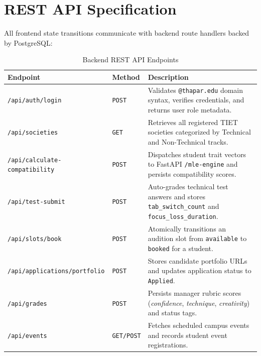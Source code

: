 \documentclass[12pt,a4paper]{report}
\begin{document}
\section{REST API Specification}
All frontend state transitions communicate with backend route handlers backed by PostgreSQL:
\begin{table}[H]
\centering
\renewcommand{\arraystretch}{1.25}
\begin{tabularx}{\textwidth}{@{}l l X@{}}
\toprule
\textbf{Endpoint} & \textbf{Method} & \textbf{Description} \\
\midrule
\texttt{/api/auth/login} & \texttt{POST} & Validates \texttt{@thapar.edu} domain syntax, verifies credentials, and returns user role metadata. \\
\texttt{/api/societies} & \texttt{GET} & Retrieves all registered TIET societies categorized by Technical and Non-Technical tracks. \\
\texttt{/api/calculate-compatibility} & \texttt{POST} & Dispatches student trait vectors to FastAPI \texttt{/mle-engine} and persists compatibility scores. \\
\texttt{/api/test-submit} & \texttt{POST} & Auto-grades technical test answers and stores \texttt{tab\_switch\_count} and \texttt{focus\_loss\_duration}. \\
\texttt{/api/slots/book} & \texttt{POST} & Atomically transitions an audition slot from \texttt{available} to \texttt{booked} for a student. \\
\texttt{/api/applications/portfolio} & \texttt{POST} & Stores candidate portfolio URLs and updates application status to \texttt{Applied}. \\
\texttt{/api/grades} & \texttt{POST} & Persists manager rubric scores (\textit{confidence}, \textit{technique}, \textit{creativity}) and status tags. \\
\texttt{/api/events} & \texttt{GET/POST} & Fetches scheduled campus events and records student event registrations. \\
\bottomrule
\end{tabularx}
\caption{Backend REST API Endpoints}
\end{table}
\end{document}
